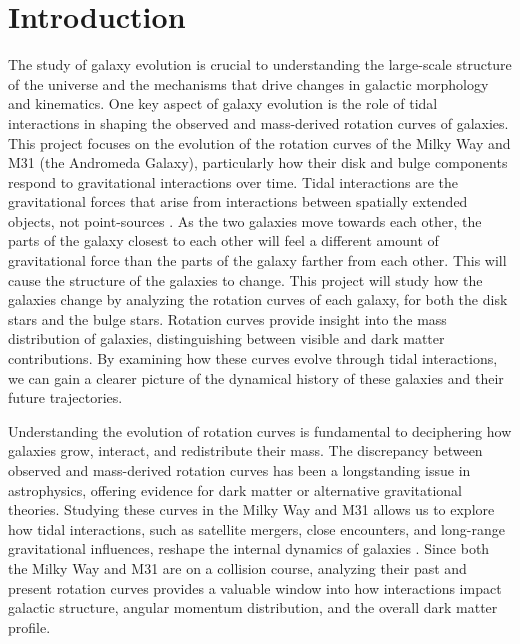 \documentclass[twocolumn,linenumbers,trackchanges]{aastex7}
\begin{document}
\section{Introduction}
The study of galaxy evolution is crucial to understanding the large-scale structure of the universe and the mechanisms that drive changes in galactic morphology and kinematics.
One key aspect of galaxy evolution is the role of tidal interactions in shaping the observed and mass-derived rotation curves of galaxies.
This project focuses on the evolution of the rotation curves of the Milky Way and M31 (the Andromeda Galaxy), particularly how their disk and bulge components respond to gravitational interactions over time.
Tidal interactions are the gravitational forces that arise from interactions between spatially extended objects, not point-sources \citep{GalacticBulges}.
As the two galaxies move towards each other, the parts of the galaxy closest to each other will feel a different amount of gravitational force than the parts of the galaxy farther from each other. This will cause the structure of the galaxies to change.
This project will study how the galaxies change by analyzing the rotation curves of each galaxy, for both the disk stars and the bulge stars.
Rotation curves provide insight into the mass distribution of galaxies, distinguishing between visible and dark matter contributions.
By examining how these curves evolve through tidal interactions, we can gain a clearer picture of the dynamical history of these galaxies and their future trajectories.

Understanding the evolution of rotation curves is fundamental to deciphering how galaxies grow, interact, and redistribute their mass.
The discrepancy between observed and mass-derived rotation curves has been a longstanding issue in astrophysics, offering evidence for dark matter or alternative gravitational theories.
Studying these curves in the Milky Way and M31 allows us to explore how tidal interactions, such as satellite mergers, close encounters, and long-range gravitational influences, reshape the internal dynamics of galaxies \citep{Hopkins2007}.
Since both the Milky Way and M31 are on a collision course, analyzing their past and present rotation curves provides a valuable window into how interactions impact galactic structure, angular momentum distribution, and the overall dark matter profile.
\end{document}
